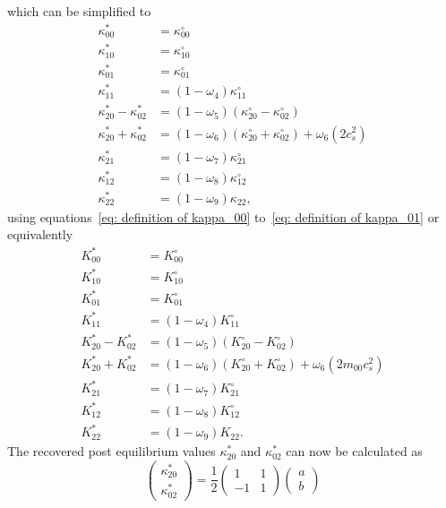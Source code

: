 which can be simplified to
\begin{equation}
  \label{eq: collision final before simplification}
  \begin{aligned}
    \kappa_{00}^{*} & = \kappa_{00}^{\circ}\\
    \kappa_{10}^{*} & = \kappa_{10}^{\circ}\\
    \kappa_{01}^{*} & = \kappa_{01}^{\circ}\\
    \kappa_{11}^{*} & = (1-\omega_4)\kappa_{11}^{\circ}\\
    \kappa_{20}^{*} - \kappa_{02}^{*}
      & = (1-\omega_5) (\kappa_{20}^{\circ}- \kappa_{02}^{\circ}) \\
    \kappa_{20}^{*} + \kappa_{02}^{*}
      & = (1-\omega_6)(\kappa_{20}^{\circ}+ \kappa_{02}^{\circ}) + \omega_6 \left( 2 c_s^2 \right) \\
    \kappa_{21}^{*} & = (1-\omega_7)\kappa_{21}^{\circ}\\
    \kappa_{12}^{*} & = (1-\omega_8)\kappa_{12}^{\circ}\\
    \kappa_{22}^{*} & = (1-\omega_9)\kappa_{22},
  \end{aligned}
\end{equation}
using equations~\eqref{eq: definition of kappa_00} to~\eqref{eq: definition of kappa_01} or equivalently
\begin{equation}
  \label{eq: collision final before simplification normalized}
  \begin{aligned}
    K_{00}^{*} & = K_{00}^{\circ}\\
    K_{10}^{*} & = K_{10}^{\circ}\\
    K_{01}^{*} & = K_{01}^{\circ}\\
    K_{11}^{*} & = (1-\omega_4)K_{11}^{\circ}\\
    K_{20}^{*} - K_{02}^{*}
      & = (1-\omega_5) (K_{20}^{\circ}- K_{02}^{\circ}) \\
    K_{20}^{*} + K_{02}^{*}
      & = (1-\omega_6)(K_{20}^{\circ}+ K_{02}^{\circ}) + \omega_6 \left( 2 m_{00} c_s^2 \right) \\
    K_{21}^{*} & = (1-\omega_7)K_{21}^{\circ}\\
    K_{12}^{*} & = (1-\omega_8)K_{12}^{\circ}\\
    K_{22}^{*} & = (1-\omega_9)K_{22}.
  \end{aligned}
\end{equation}
The recovered post equilibrium values $\kappa_{20}^{*}$ and $\kappa_{02}^{*}$ can now be calculated as
\begin{equation*}
  \begin{pmatrix}
    \kappa_{20}^{*} \\
    \kappa_{02}^{*}
  \end{pmatrix}
  = \frac{1}{2}
  \begin{pmatrix}
    1 & 1 \\ -1 & 1
  \end{pmatrix}
  \begin{pmatrix}
    a\\
    b
  \end{pmatrix}
\end{equation*}
